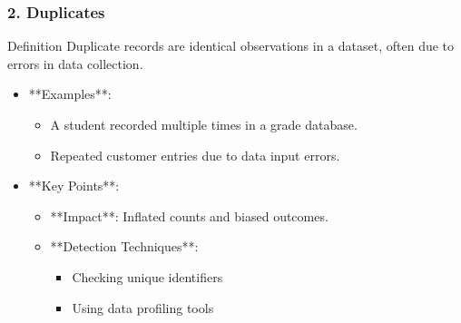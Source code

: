 \documentclass[aspectratio=169]{beamer}
\begin{document}
\begin{frame}[fragile]
    \frametitle{2. Duplicates}
    \begin{block}{Definition}
        Duplicate records are identical observations in a dataset, often due to errors in data collection.
    \end{block}
    
    \begin{itemize}
        \item **Examples**:
        \begin{itemize}
            \item A student recorded multiple times in a grade database.
            \item Repeated customer entries due to data input errors.
        \end{itemize}
        
        \item **Key Points**:
        \begin{itemize}
            \item **Impact**: Inflated counts and biased outcomes.
            \item **Detection Techniques**:
            \begin{itemize}
                \item Checking unique identifiers
                \item Using data profiling tools
            \end{itemize}
        \end{itemize}
    \end{itemize}
\end{frame}
\end{document}

